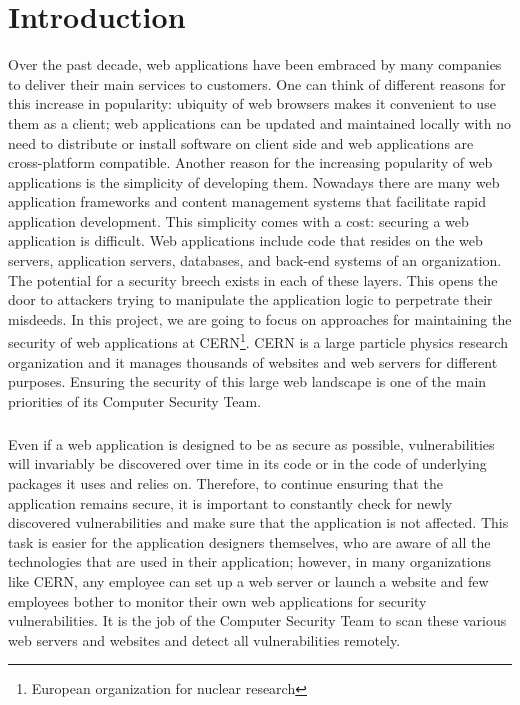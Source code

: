 \chapter{Introduction}
\label{introduction}
\thispagestyle{empty}
Over the past decade, web applications have been embraced by many companies to deliver their main services to customers. One can think of different reasons for this increase in popularity: ubiquity of web browsers makes it convenient to use them as a client; web applications can be updated and maintained locally with no need to distribute or install software on client side and web applications are cross-platform compatible.
Another reason for the increasing popularity of web applications is the simplicity of developing them. Nowadays there are many web application frameworks and content management systems that facilitate rapid application development. This simplicity comes with a cost: securing a web application is difficult. Web applications include code that resides on the web servers, application servers, databases, and back-end systems of an organization. The potential for a security breech exists in each of these layers. This opens the door to attackers trying to manipulate the application logic to perpetrate their misdeeds\cite{secure_web}. In this project, we are going to focus on approaches for maintaining the security of web applications at CERN\footnote{European organization for nuclear research}. CERN is a large particle physics research organization and it manages thousands of websites and web servers for different purposes. Ensuring the security of this large web landscape is one of the main priorities of its Computer Security Team.

\paragraph{}
Even if a web application is designed to be as secure as possible, vulnerabilities will invariably be discovered over time in its code or in the code of underlying packages it uses and relies on. Therefore, to continue ensuring that the application remains secure, it is important to constantly check for newly discovered vulnerabilities and make sure that the application is not affected. This task is easier for the application designers themselves, who are aware of all the technologies that are used in their application; however, in many organizations like CERN, any employee can set up a web server or launch a website and few employees bother to monitor their own web applications for security vulnerabilities. It is the job of the Computer Security Team to scan these various web servers and websites and detect all vulnerabilities remotely.
